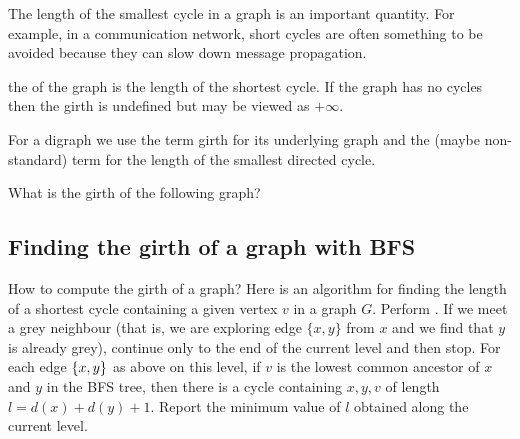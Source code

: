 The length of the smallest cycle in a graph is an important quantity. 
For example, in a communication network, short cycles are often something to be
avoided because they can slow down message propagation.


\begin{Definition}
the  of the graph is the length of the shortest cycle. If the graph has no cycles then the
girth is undefined but may be viewed as $+\infty$. 

For a digraph we use the term girth for its underlying graph and the (maybe non-standard) term  for
the length of the smallest directed cycle.
\end{Definition}

\begin{Boxample}[4]
What is the girth of the following graph?

\end{Boxample}

%

\subsection{Finding the girth of a graph with BFS}

How to compute the girth of a graph? Here is an algorithm for finding
the length of a shortest cycle containing a given vertex $v$ in a graph
$G$. Perform . If we meet a grey neighbour (that is,
we are exploring edge $\{x, y\}$ from $x$ and we find that $y$ is already
grey), continue only to the end of the current level and then stop. For
each edge $\mbox{$\{x, y\}$}$ as above on this level, if $v$ is the lowest
common ancestor of $x$ and $y$ in the BFS tree, then there is a cycle
containing $x, y, v$ of length $l=d(x) + d(y) + 1$. Report the minimum
value of $l$ obtained along the current level.

